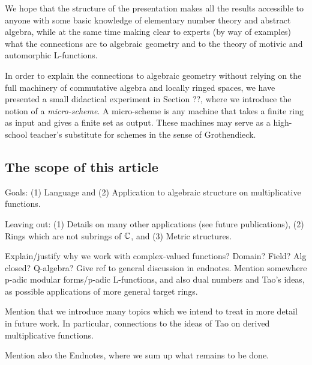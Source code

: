 We hope that the structure of the presentation makes all the results accessible to anyone with some basic knowledge of elementary number theory and abstract algebra, while at the same time making clear to experts (by way of examples) what the connections are to algebraic geometry and to the theory of motivic and automorphic L-functions. 

In order to explain the connections to algebraic geometry without relying on the full machinery of commutative algebra and locally ringed spaces, we have presented a small didactical experiment in Section ??, where we introduce the notion of a \emph{micro-scheme}. A micro-scheme is any machine that takes a finite ring as input and gives a finite set as output. These machines may serve as a high-school teacher's substitute for schemes in the sense of Grothendieck.

\subsection{The scope of this article}

Goals: (1) Language and (2) Application to algebraic structure on multiplicative functions.

Leaving out: (1) Details on many other applications (see future publications), (2) Rings which are not subrings of $\mathbb{C}$, and (3) Metric structures.

Explain/justify why we work with complex-valued functions? Domain? Field? Alg closed? Q-algebra? Give ref to general discussion in endnotes. Mention somewhere p-adic modular forms/p-adic L-functions, and also dual numbers and Tao's ideas, as possible applications of more general target rings.

Mention that we introduce many topics which we intend to treat in more detail in future work. In particular, connections to the ideas of Tao on derived multiplicative functions.

Mention also the Endnotes, where we sum up what remains to be done.


